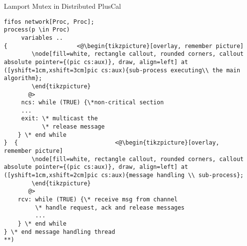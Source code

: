 \documentclass{beamer}
\begin{document}
\begin{frame}[fragile]{Lamport Mutex in Distributed PlusCal}
\begin{exampleblock}{} 
\begin{lstlisting}[language=pluscal, frame = none, numbers = none]
fifos network[Proc, Proc];
process(p \in Proc)
     variables ..
{                    <@\begin{tikzpicture}[overlay, remember picture]
        \node[fill=white, rectangle callout, rounded corners, callout absolute pointer={(pic cs:aux)}, draw, align=left] at ([yshift=1cm,xshift=3cm]pic cs:aux){sub-process executing\\ the main algorithm};
        \end{tikzpicture}
       @>
     ncs: while (TRUE) {\*non-critical section
     ... 
     exit: \* multicast the
           \* release message 
    } \* end while
}  {                            <@\begin{tikzpicture}[overlay, remember picture]
        \node[fill=white, rectangle callout, rounded corners, callout absolute pointer={(pic cs:aux)}, draw, align=left] at ([yshift=1cm,xshift=2cm]pic cs:aux){message handling \\ sub-process};
        \end{tikzpicture}
       @>
    rcv: while (TRUE) {\* receive msg from channel
         \* handle request, ack and release messages
         ...
    } \* end while
} \* end message handling thread
**)
\end{lstlisting}
\end{exampleblock}
\end{frame}
\end{document}
